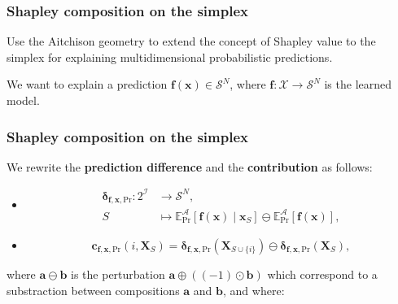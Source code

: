 \documentclass{beamer}
\begin{document}
\begin{frame}
  \frametitle{Shapley composition on the simplex}

  \begin{center}
    \large
    Use the Aitchison geometry to extend the concept of Shapley value to the simplex for explaining multidimensional probabilistic predictions.
  \end{center}
  \vspace{1cm}
\pause
  We want to explain a prediction $\bm{f}(\bm{x}) \in  \mathcal{S}^N$, where $\bm{f}:\mathcal{X}\to \mathcal{S}^N$ is the learned model.
\begin{figure}
  \centering
    \end{figure}

  \end{frame}

  \begin{frame}
    \frametitle{Shapley composition on the simplex}

    We rewrite the \textbf{prediction difference} and the \textbf{contribution} as follows:
    \begin{itemize}
      \pause
    \item \begin{equation}
        \begin{aligned}
          \bm{\delta}_{\bm{f},\bm{x},\text{Pr}}: 2^{\mathcal{I}} &\to \mathcal{S}^N,\\
          S &\mapsto \mathbb{E}^{\mathcal{A}}_\text{Pr}[\bm{f}(\bm{x})\mid \bm{x}_S] \ominus \mathbb{E}^{\mathcal{A}}_\text{Pr}[\bm{f}(\bm{x})],
        \end{aligned}
      \end{equation}
      \pause
      \item \begin{equation}
        \bm{c}_{\bm{f},\bm{x},\text{Pr}}(i,\bm{X}_S) = \bm{\delta}_{\bm{f},\bm{x},\text{Pr}}(\bm{X}_{S\cup\{i\}}) \ominus \bm{\delta}_{\bm{f},\bm{x},\text{Pr}}(\bm{X}_S),
      \end{equation}
    \end{itemize}
where $\bm{a}\ominus\bm{b}$ is the perturbation $\bm{a} \oplus \left( (-1)\odot \bm{b}\right)$ which correspond to a substraction between compositions $\bm{a}$ and $\bm{b}$, and where:
    
\end{frame}
\end{document}
